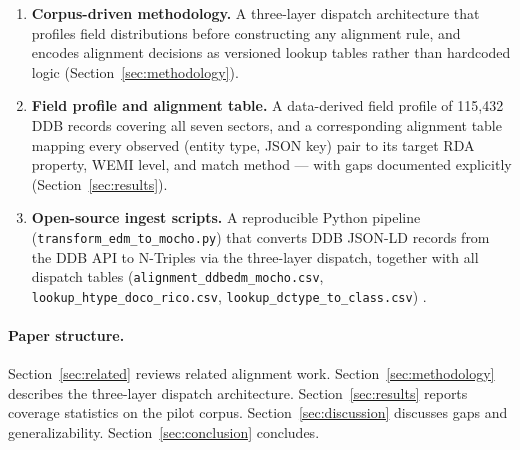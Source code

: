 \begin{enumerate}
  \item \textbf{Corpus-driven methodology.}
        A three-layer dispatch architecture that profiles field distributions
        before constructing any alignment rule, and encodes alignment decisions
        as versioned lookup tables rather than hardcoded logic
        (Section~\ref{sec:methodology}).

  \item \textbf{Field profile and alignment table.}
        A data-derived field profile of 115{,}432 DDB records covering all
        seven sectors, and a corresponding alignment table mapping every
        observed (entity type, JSON key) pair to its target RDA property,
        WEMI level, and match method --- with gaps documented explicitly
        (Section~\ref{sec:results}).

  \item \textbf{Open-source ingest scripts.}
        A reproducible Python pipeline (\texttt{transform\_edm\_to\_mocho.py})
        that converts DDB JSON-LD records from the DDB API to N-Triples via
        the three-layer dispatch, together with all dispatch tables
        (\texttt{alignment\_ddbedm\_mocho.csv},
        \texttt{lookup\_htype\_doco\_rico.csv},
        \texttt{lookup\_dctype\_to\_class.csv}) .
\end{enumerate}

\paragraph{Paper structure.}
Section~\ref{sec:related} reviews related alignment work.
Section~\ref{sec:methodology} describes the three-layer dispatch architecture.
Section~\ref{sec:results} reports coverage statistics on the pilot corpus.
Section~\ref{sec:discussion} discusses gaps and generalizability.
Section~\ref{sec:conclusion} concludes.
